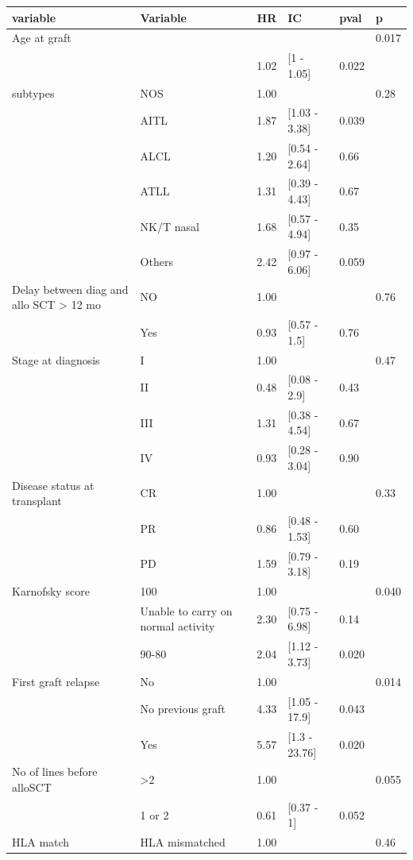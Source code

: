 \documentclass[a4paper,11pt] {article}
\begin{document}
\begin{center}
\begin{landscape}
\begin{longtable}{llrlll}
  \hline
variable & Variable & HR & IC & pval & p \\ 
  \hline
Age at graft &  &  &  &  & 0.017 \\ 
   &  & 1.02 & [1 - 1.05] & 0.022 &  \\ 
  subtypes & NOS & 1.00 &  &  & 0.28 \\ 
   & AITL & 1.87 & [1.03 - 3.38] & 0.039 &  \\ 
   & ALCL & 1.20 & [0.54 - 2.64] & 0.66 &  \\ 
   & ATLL & 1.31 & [0.39 - 4.43] & 0.67 &  \\ 
   & NK/T nasal & 1.68 & [0.57 - 4.94] & 0.35 &  \\ 
   & Others & 2.42 & [0.97 - 6.06] & 0.059 &  \\ 
  Delay between diag and allo SCT > 12 mo & NO & 1.00 &  &  & 0.76 \\ 
   & Yes & 0.93 & [0.57 - 1.5] & 0.76 &  \\ 
  Stage at diagnosis & I & 1.00 &  &  & 0.47 \\ 
   & II & 0.48 & [0.08 - 2.9] & 0.43 &  \\ 
   & III & 1.31 & [0.38 - 4.54] & 0.67 &  \\ 
   & IV & 0.93 & [0.28 - 3.04] & 0.90 &  \\ 
  Disease status at transplant & CR & 1.00 &  &  & 0.33 \\ 
   & PR & 0.86 & [0.48 - 1.53] & 0.60 &  \\ 
   & PD & 1.59 & [0.79 - 3.18] & 0.19 &  \\ 
  Karnofsky score & 100 & 1.00 &  &  & 0.040 \\ 
   & Unable to carry on normal activity & 2.30 & [0.75 - 6.98] & 0.14 &  \\ 
   & 90-80 & 2.04 & [1.12 - 3.73] & 0.020 &  \\ 
  First graft relapse & No & 1.00 &  &  & 0.014 \\ 
   & No previous graft & 4.33 & [1.05 - 17.9] & 0.043 &  \\ 
   & Yes & 5.57 & [1.3 - 23.76] & 0.020 &  \\ 
  No of lines before alloSCT & >2 & 1.00 &  &  & 0.055 \\ 
   & 1 or 2 & 0.61 & [0.37 - 1] & 0.052 &  \\ 
  HLA match & HLA mismatched & 1.00 &  &  & 0.46 \\ 

\end{longtable}
\end{landscape}
\end{center}
\end{document}
